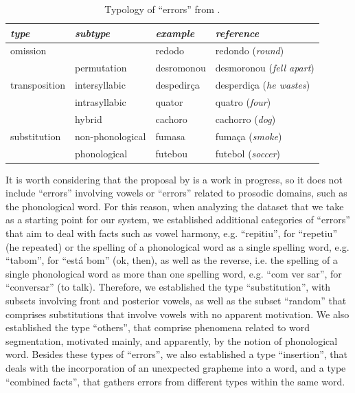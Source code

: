 \begin{table}[!ht]
\caption{Typology of ``errors'' from \citep{Chacon2018}.}
\label{tab_errors_chacon}
\centering
\begin{small}
\begin{tabular}{llll}
\hline
\hline
\textit{type} & \textit{subtype} & \textit{example} & \textit{reference} \\
\hline
omission & & redodo & redondo (\textit{round}) \\
\hline
\multirow{3}{*}{transposition}
& permutation   & desromonou & desmoronou (\textit{fell apart})\\
& intersyllabic & despedirça & desperdiça (\textit{he wastes}) \\
& intrasyllabic & quator     & quatro (\textit{four}) \\
\hline
\multirow{3}{*}{substitution}
& hybrid           & cachoro & cachorro (\textit{dog}) \\
& non-phonological & fumasa  & fumaça (\textit{smoke}) \\
& phonological     & futebou & futebol (\textit{soccer}) \\
\hline
\hline
\end{tabular}
\end{small}
\end{table}


It is worth considering that the proposal by \citet{Chacon2018} is a work in progress, so it does not include ``errors'' involving vowels or ``errors'' related to prosodic domains, such as the phonological word. For this reason, when analyzing the dataset that we take as a starting point for our system, we established additional categories of ``errors'' that aim to deal with facts such as vowel harmony, e.g. ``repitiu'', for ``repetiu'' (he repeated) or the spelling of a phonological word as a single spelling word, e.g. ``tabom'', for ``está bom'' (ok, then), as well as the reverse, i.e. the spelling of a single phonological word as more than one spelling word, e.g. ``com ver sar'', for ``conversar'' (to talk). Therefore, we established the type ``substitution'', with subsets involving front and posterior vowels, as well as the subset ``random'' that comprises substitutions that involve vowels with no apparent motivation. We also established the type ``others'', that comprise phenomena related to word segmentation, motivated mainly, and apparently, by the notion of phonological word. Besides these types of ``errors'', we also established a type ``insertion'', that deals with the incorporation of an unexpected grapheme into a word, and a type ``combined facts'', that gathers errors from different types within the same word.


